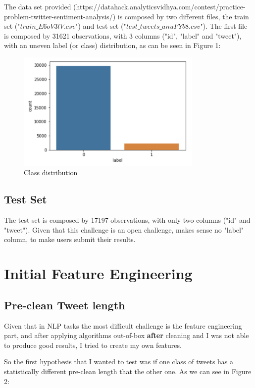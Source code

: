 \documentclass{article}
\begin{document}
	The data set provided (https://datahack.analyticsvidhya.com/contest/practice-problem-twitter-sentiment-analysis/) is composed by two different files, the train set ("$train\_E6oV3lV.csv$") and test set ("$test\_tweets\_anuFYb8.csv$"). The first file is composed by 31621 observations, with 3 columns ("id", "label" and "tweet"), with an uneven label (or class) distribution, as can be seen in Figure 1:
	
	\begin{figure}[h!]
		\label{Figure 1}
		\caption{Class distribution}
		\includegraphics[width=9cm]{classes.png}
		\centering
	\end{figure}
	
	\subsection{Test Set}
	
	The test set is composed by 17197 observations, with only two columns ("id" and "tweet"). Given that this challenge is an open challenge, makes sense no "label" column, to make users submit their results. 
	
	\section{Initial Feature Engineering}
	
	\subsection{Pre-clean Tweet length}
	
	Given that in NLP tasks the most difficult challenge is the feature engineering part, and after applying algorithms out-of-box \textbf{after} cleaning and I was not able to produce good results, I tried to create my own features. 
	
	So the first hypothesis that I wanted to test was if one class of tweets has a statistically different pre-clean length that the other one. As we can see in Figure 2:
	
\end{document}
